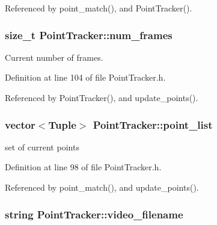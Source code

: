 \-Referenced by point\-\_\-match(), and \-Point\-Tracker().

\hypertarget{class_point_tracker_aa32e4991c19d192737ae6d5db32a504a}{
\subsubsection[{num\-\_\-frames}]{\setlength{\rightskip}{0pt plus 5cm}size\-\_\-t {\bf \-Point\-Tracker\-::num\-\_\-frames}}}
\label{class_point_tracker_aa32e4991c19d192737ae6d5db32a504a}


\-Current number of frames. 



\-Definition at line 104 of file \-Point\-Tracker.\-h.



\-Referenced by \-Point\-Tracker(), and update\-\_\-points().

\hypertarget{class_point_tracker_a3c396dbdf7e00c4cce3b371dd5cddd28}{
\subsubsection[{point\-\_\-list}]{\setlength{\rightskip}{0pt plus 5cm}vector$<${\bf \-Tuple}$>$ {\bf \-Point\-Tracker\-::point\-\_\-list}}}
\label{class_point_tracker_a3c396dbdf7e00c4cce3b371dd5cddd28}


set of current points 



\-Definition at line 98 of file \-Point\-Tracker.\-h.



\-Referenced by point\-\_\-match(), and update\-\_\-points().

\hypertarget{class_point_tracker_a104961431d688ff50c5d3627be38a261}{
\subsubsection[{video\-\_\-filename}]{\setlength{\rightskip}{0pt plus 5cm}string {\bf \-Point\-Tracker\-::video\-\_\-filename}}}
\label{class_point_tracker_a104961431d688ff50c5d3627be38a261}


